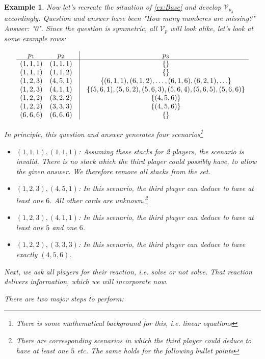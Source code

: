 \documentclass{article}
\newtheorem{example}{Example}[section]
\begin{document}
\begin{example}
Now let's recreate the situation of \cref{ex:Base} and develop $\mathcal{V}_{p_3}$ accordingly. Question and answer have been "How many numberes are missing?" Answer: "0". Since the question is symmetric, all $\mathcal{V}_p$ will look alike, let's look at some example rows:

\[
\begin{array}{cccc}
p_1 & p_2 & \vline & p_3 \\ \hline
(1,1,1) & (1,1,1) & \vline & \{ \} \\
(1,1,1) & (1,1,2) & \vline & \{ \} \\
(1,2,3) & (4,5,1) & \vline & \{ (6,1,1), (6,1,2), \ldots, (6,1,6), (6,2,1), \ldots \} \\
(1,2,3) & (4,1,1) & \vline & \{ (5,6,1), (5,6,2), (5,6,3), (5,6,4), (5,6,5), (5,6,6) \} \\
(1,2,2) & (3,2,2) & \vline & \{ (4,5,6) \} \\
(1,2,2) & (3,3,3) & \vline & \{ (4,5,6) \} \\
(6,6,6) & (6,6,6) & \vline & \{ \}
\end{array} 
\]

In principle, this question and answer generates four scenarios\footnote{There is some mathematical background for this, i.e. linear equations}

\begin{itemize}
\item $(1,1,1), (1,1,1)$: Assuming these stacks for 2 players, the scenario is invalid. There is no stack which the third player could possibly have, to allow the given answer. We therefore remove all stacks from the set.
\item $(1,2,3), (4,5,1)$: In this scenario, the third player can deduce to have at least one $6$. All other cards are unknown.\footnote{There are corresponding scenarios in which the third player could deduce to have at least one $5$ etc. The same holds for the following bullet points}
\item $(1,2,3), (4,1,1)$: In this scenario, the third player can deduce to have at least one $5$ and one $6$.
\item $(1,2,2), (3,3,3)$: In this scenario, the third player can deduce to have exactly $(4,5,6)$.
\end{itemize}

Next, we ask all players for their reaction, i.e. solve or not solve. That reaction delivers information, which we will incorporate now.

There are two major steps to perform:


\end{example}
\end{document}
